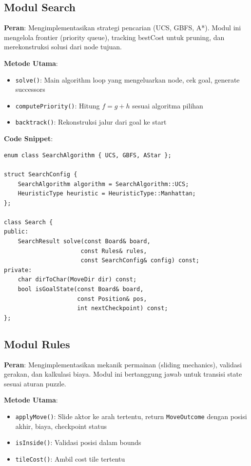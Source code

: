 \subsection{Modul Search}

\textbf{Peran}: Mengimplementasikan strategi pencarian (UCS, GBFS, A*). Modul ini mengelola frontier (priority queue), tracking bestCost untuk pruning, dan merekonstruksi solusi dari node tujuan.

\textbf{Metode Utama}:
\begin{itemize}
    \item \texttt{solve()}: Main algorithm loop yang mengeluarkan node, cek goal, generate successors
    \item \texttt{computePriority()}: Hitung $f = g + h$ sesuai algoritma pilihan
    \item \texttt{backtrack()}: Rekonstruksi jalur dari goal ke start
\end{itemize}

\textbf{Code Snippet}:
\begin{tcolorbox}[colback=blue!5, title=Search Class Header]
    \begin{verbatim}
enum class SearchAlgorithm { UCS, GBFS, AStar };

struct SearchConfig {
    SearchAlgorithm algorithm = SearchAlgorithm::UCS;
    HeuristicType heuristic = HeuristicType::Manhattan;
};

class Search {
public:
    SearchResult solve(const Board& board, 
                      const Rules& rules,
                      const SearchConfig& config) const;
private:
    char dirToChar(MoveDir dir) const;
    bool isGoalState(const Board& board, 
                     const Position& pos,
                     int nextCheckpoint) const;
};
\end{verbatim}
\end{tcolorbox}

\subsection{Modul Rules}

\textbf{Peran}: Mengimplementasikan mekanik permainan (sliding mechanics), validasi gerakan, dan kalkulasi biaya. Modul ini bertanggung jawab untuk transisi state sesuai aturan puzzle.

\textbf{Metode Utama}:
\begin{itemize}
    \item \texttt{applyMove()}: Slide aktor ke arah tertentu, return \texttt{MoveOutcome} dengan posisi akhir, biaya, checkpoint status
    \item \texttt{isInside()}: Validasi posisi dalam bounds
    \item \texttt{tileCost()}: Ambil cost tile tertentu
\end{itemize}

